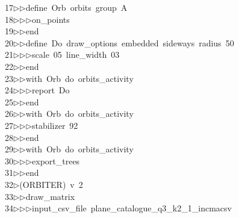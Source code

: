 \begin{tabbing}
17\>$\triangleright$\>$\triangleright$\>define\ Orb\ orbits\ group\ A\ \\[0pt]
18\>$\triangleright$\>$\triangleright$\>$\triangleright$\>on\_points\ \\[0pt]
19\>$\triangleright$\>$\triangleright$\>end\ \\[0pt]
20\>$\triangleright$\>$\triangleright$\>define\ Do\ draw\_options\ embedded\ sideways\ radius\ 50\ \\[0pt]
21\>$\triangleright$\>$\triangleright$\>$\triangleright$\>scale\ 05\ line\_width\ 03\ \\[0pt]
22\>$\triangleright$\>$\triangleright$\>end\ \\[0pt]
23\>$\triangleright$\>$\triangleright$\>with\ Orb\ do\ orbits\_activity\ \\[0pt]
24\>$\triangleright$\>$\triangleright$\>$\triangleright$\>report\ Do\ \\[0pt]
25\>$\triangleright$\>$\triangleright$\>end\ \\[0pt]
26\>$\triangleright$\>$\triangleright$\>with\ Orb\ do\ orbits\_activity\ \\[0pt]
27\>$\triangleright$\>$\triangleright$\>$\triangleright$\>stabilizer\ 92\ \\[0pt]
28\>$\triangleright$\>$\triangleright$\>end\ \\[0pt]
29\>$\triangleright$\>$\triangleright$\>with\ Orb\ do\ orbits\_activity\ \\[0pt]
30\>$\triangleright$\>$\triangleright$\>$\triangleright$\>export\_trees\ \\[0pt]
31\>$\triangleright$\>$\triangleright$\>end\\[0pt]
32\>$\triangleright$\>(ORBITER)\ v\ 2\ \\[0pt]
33\>$\triangleright$\>$\triangleright$\>draw\_matrix\ \\[0pt]
34\>$\triangleright$\>$\triangleright$\>$\triangleright$\>input\_csv\_file\ plane\_catalogue\_q3\_k2\_1\_incmacsv\ \\[0pt]

\end{tabbing}
